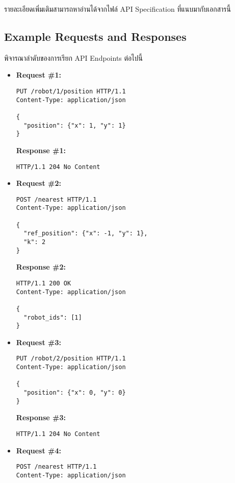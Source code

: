 \noindent
รายละเอียดเพิ่มเติมสามารถหาอ่านได้จากไฟล์ API Specification ที่แนบมากับเอกสารนี้

\subsection{Example Requests and Responses}

\noindent
พิจารณาลำดับของการเรียก API Endpoints ต่อไปนี้

\begin{itemize}
\item  %
\textbf{Request \#1:}
\begin{lstlisting}[xleftmargin=1pc,numbers=none]
PUT /robot/1/position HTTP/1.1
Content-Type: application/json

{
  "position": {"x": 1, "y": 1}
}
\end{lstlisting}
\textbf{Response \#1:}
\begin{lstlisting}[xleftmargin=1pc,numbers=none]
HTTP/1.1 204 No Content
\end{lstlisting}

\item  %
\textbf{Request \#2:}
\begin{lstlisting}[xleftmargin=1pc,numbers=none]
POST /nearest HTTP/1.1
Content-Type: application/json

{
  "ref_position": {"x": -1, "y": 1},
  "k": 2
}
\end{lstlisting}
\newpage
\textbf{Response \#2:}
\begin{lstlisting}[xleftmargin=1pc,numbers=none]
HTTP/1.1 200 OK
Content-Type: application/json

{
  "robot_ids": [1]
}
\end{lstlisting}

\item  %
\textbf{Request \#3:}
\begin{lstlisting}[xleftmargin=1pc,numbers=none]
PUT /robot/2/position HTTP/1.1
Content-Type: application/json

{
  "position": {"x": 0, "y": 0}
}
\end{lstlisting}
\textbf{Response \#3:}
\begin{lstlisting}[xleftmargin=1pc,numbers=none]
HTTP/1.1 204 No Content
\end{lstlisting}

\item  %
\textbf{Request \#4:}
\begin{lstlisting}[xleftmargin=1pc,numbers=none]
POST /nearest HTTP/1.1
Content-Type: application/json


\end{lstlisting}
\end{itemize}
